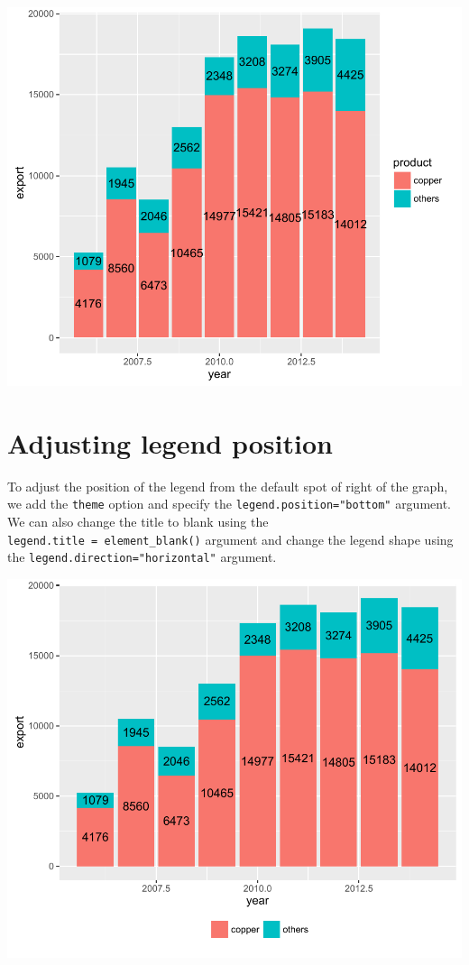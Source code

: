 \begin{center}\includegraphics[width=0.6\linewidth]{3_Bar_Plots_pdf/bar_3-1} \end{center}

\section{Adjusting legend position}\label{adjusting-legend-position}

To adjust the position of the legend from the default spot of right of
the graph, we add the \texttt{theme} option and specify the
\texttt{legend.position="bottom"} argument. We can also change the title
to blank using the \texttt{legend.title\ =\ element\_blank()} argument
and change the legend shape using the\newline
\texttt{legend.direction="horizontal"} argument.

\begin{Shaded}
\begin{Highlighting}[]
\StringTok{ }\StringTok{ }\NormalTok{(}\NormalTok{, }\NormalTok{, }
   \NormalTok{())}
\end{Highlighting}
\end{Shaded}

\begin{center}\includegraphics[width=0.6\linewidth]{3_Bar_Plots_pdf/bar_4-1} \end{center}

